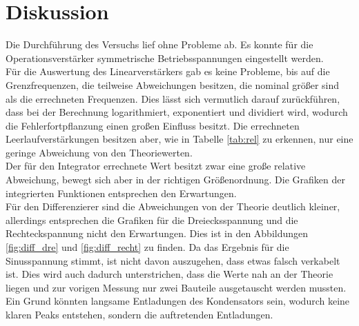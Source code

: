\newpage
\section{Diskussion}

\noindent
Die Durchführung des Versuchs lief ohne Probleme ab. Es konnte für die Operationsverstärker symmetrische Betriebsspannungen eingestellt werden.\\
Für die Auswertung des Linearverstärkers gab es keine Probleme, bis auf die Grenzfrequenzen, die teilweise Abweichungen besitzen, die nominal größer sind als die errechneten Frequenzen.
Dies lässt sich vermutlich darauf zurückführen, dass bei der Berechnung logarithmiert, exponentiert und dividiert wird, wodurch die Fehlerfortpflanzung einen großen Einfluss besitzt.
Die errechneten Leerlaufverstärkungen besitzen aber, wie in Tabelle \ref{tab:rel} zu erkennen, nur eine geringe Abweichung von den Theoriewerten.\\
Der für den Integrator errechnete Wert besitzt zwar eine große relative Abweichung, bewegt sich aber in der richtigen Größenordnung. 
Die Grafiken der integrierten Funktionen entsprechen den Erwartungen.\\
Für den Differenzierer sind die Abweichungen von der Theorie deutlich kleiner, allerdings entsprechen die Grafiken für die Dreiecksspannung und die Rechteckspannung nicht den Erwartungen.
Dies ist in den Abbildungen \ref{fig:diff_dre} und \ref{fig:diff_recht} zu finden. 
Da das Ergebnis für die Sinusspannung stimmt, ist nicht davon auszugehen, dass etwas falsch verkabelt ist. 
Dies wird auch dadurch unterstrichen, dass die Werte nah an der Theorie liegen und zur vorigen Messung nur zwei Bauteile ausgetauscht werden mussten.
Ein Grund könnten langsame Entladungen des Kondensators sein, wodurch keine klaren Peaks entstehen, sondern die auftretenden Entladungen. 


